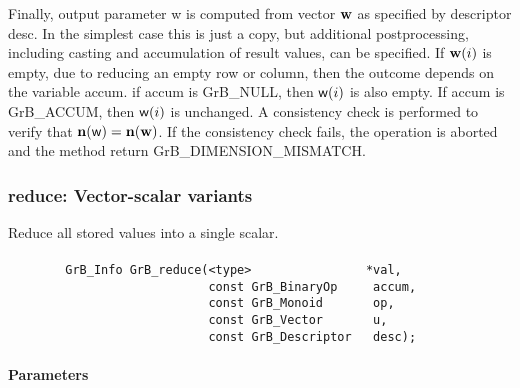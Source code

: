 Finally, output parameter {\sf w} is computed from vector ${\bf w}$
as specified by descriptor {\sf desc}. In the simplest case this
is just a copy, but additional postprocessing, including casting and
accumulation of result values, can be specified. 
 If ${\bf w}(i)$ is empty, due to reducing an empty row or column, then the outcome depends on the variable {\sf accum}.
  if {\sf accum} is GrB\_NULL, then ${\sf w}(i)$ is also empty. If {\sf accum} is GrB\_ACCUM, then ${\sf w}(i)$ is unchanged.
A consistency check is
performed to verify that $\bold{n}({\sf w}) = \bold{n}({\bf w})$. If
the consistency check fails, the operation is aborted and the method
return {\sf GrB\_DIMENSION\_MISMATCH}.


\subsubsection{{\sf reduce}: Vector-scalar variants}
\label{Sec:Reduce_vector_scalar}

Reduce all stored values into a single scalar.





\paragraph{\syntax}

\begin{verbatim}
        GrB_Info GrB_reduce(<type>                *val,
                            const GrB_BinaryOp     accum,
                            const GrB_Monoid       op,
                            const GrB_Vector       u,
                            const GrB_Descriptor   desc);
\end{verbatim}


\paragraph{Parameters}

